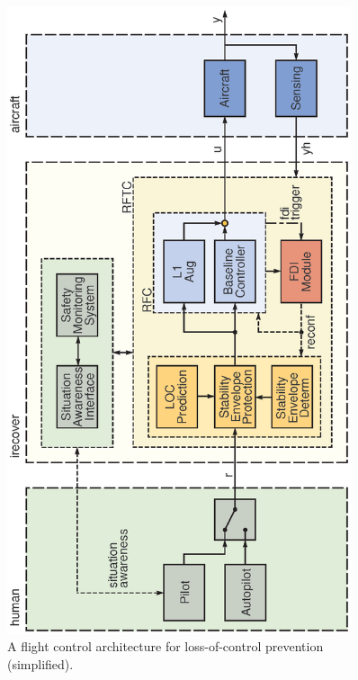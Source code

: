 \documentclass[letter,onecolumn,12pt]{aiaa-tc}
\begin{document}
\begin{figure}[t]
\includegraphics[angle=-90,width=0.90\textwidth,]{RFTCarchitecture.ps}
\caption{\footnotesize A flight control architecture for loss-of-control prevention (simplified).}
\label{fig:RFTCarchitecture}
\end{figure}
\end{document}
